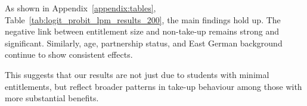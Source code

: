As shown in Appendix~\ref{appendix:tables}, Table~\ref{tab:logit_probit_lpm_results_200}, the main findings hold up. The negative link between entitlement size and non-take-up remains strong and significant. Similarly, age, partnership status, and East German background continue to show consistent effects.

This suggests that our results are not just due to students with minimal entitlements, but reflect broader patterns in take-up behaviour among those with more substantial benefits.
